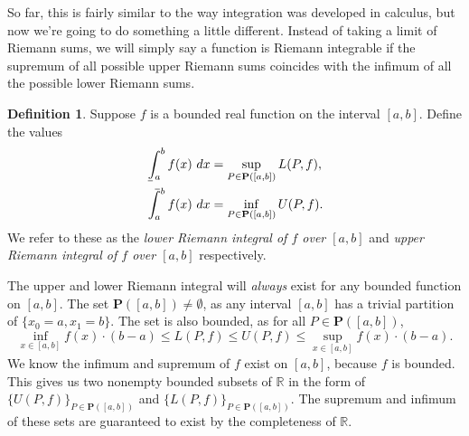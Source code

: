 \documentclass{article}
\def\upint{\mathchoice%
	{\mkern13mu\overline{\vphantom{\intop}\mkern7mu}\mkern-20mu}%
	{\mkern7mu\overline{\vphantom{\intop}\mkern7mu}\mkern-14mu}%
	{\mkern7mu\overline{\vphantom{\intop}\mkern7mu}\mkern-14mu}%
	{\mkern7mu\overline{\vphantom{\intop}\mkern7mu}\mkern-14mu}%
	\int}
\def\lowint{\mkern3mu\underline{\vphantom{\intop}\mkern7mu}\mkern-10mu\int}
\newcommand{\R}{\mathbb{R}}
\theoremstyle{definition}
\newtheorem{definition}{Definition}[section]
\begin{document}
So far, this is fairly similar to the way integration was developed in calculus, but now we're going to do something a little different. Instead of taking a limit of Riemann sums, we will simply say a function is Riemann integrable if the supremum of all possible upper Riemann sums coincides with the infimum of all the possible lower Riemann sums. 
\begin{definition}
	Suppose $ f $ is a bounded real function  on the interval $ [a,b] $. Define the values  
	\begin{align*}
		\lowint_a^b f(x)\ dx&= \sup_{P\in \textbf{P}([a,b])} L(P,f),\\
		\upint_a^b f(x)\ dx &= \inf_{P\in \textbf{P}([a,b])} U(P,f).
	\end{align*}
	We refer to these as the \textit{\color{red}lower Riemann integral of $ f $ over $ [a,b] $} and \textit{\color{red}upper Riemann integral of $ f $ over $ [a,b] $} respectively.
\end{definition}
The upper and lower Riemann integral will \textit{always} exist for any bounded function on $ [a,b] $. The set $ \mathbf{P}([a,b])\neq\emptyset$, as any interval $ [a,b] $ has a trivial partition of $ \{x_0=a,x_1=b\} $. The set is also bounded, as for all $ P\in\mathbf{P}([a,b]) $, $$\inf_{x\in[a,b]}f(x)\cdot(b-a)\le L(P,f)\le U(P,f)\le \sup_{x\in[a,b]}f(x)\cdot(b-a) .$$ We know the infimum and supremum of $ f $ exist on $ [a,b] $, because $ f $ is bounded. This gives us two nonempty bounded subsets of $ \R $ in the form of $ \{U(P,f)\}_{P\in\textbf{P}([a,b])} $ and $ \{L(P,f)\}_{P\in\textbf{P}([a,b])} $. The supremum and infimum of these sets are guaranteed to exist by the completeness of $ \R $. 
\end{document}
